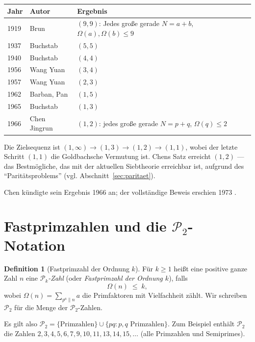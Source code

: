 \documentclass[12pt,a4paper]{amsart}
\theoremstyle{definition}
\newtheorem{definition}[theorem]{Definition}
\newcommand{\Ptwo}{\mathcal{P}_2}
\newcommand{\OOmega}{\Omega}
\begin{document}
\begin{center}
\begin{tabular}{@{}lll@{}}
\toprule
Jahr & Autor & Ergebnis \\ \midrule
1919 & Brun        & $(9,9)$: Jedes große gerade $N = a + b$, $\OOmega(a),\OOmega(b) \leq 9$ \\
1937 & Buchstab    & $(5,5)$ \\
1940 & Buchstab    & $(4,4)$ \\
1956 & Wang Yuan   & $(3,4)$ \\
1957 & Wang Yuan   & $(2,3)$ \\
1962 & Barban, Pan & $(1,5)$ \\
1965 & Buchstab    & $(1,3)$ \\
1966 & Chen Jingrun & $(1,2)$: jedes große gerade $N = p + q$, $\OOmega(q) \leq 2$ \\
\bottomrule
\end{tabular}
\end{center}

Die Zielsequenz ist $(1,\infty) \to (1,3) \to (1,2) \to (1,1)$, wobei
der letzte Schritt $(1,1)$ die Goldbachsche Vermutung ist.  Chens Satz
erreicht $(1,2)$ --- das Bestmögliche, das mit der aktuellen Siebtheorie
erreichbar ist, aufgrund des ``Paritätsproblems'' (vgl. Abschnitt~\ref{sec:paritaet}).

Chen kündigte sein Ergebnis 1966 an; der vollständige Beweis erschien 1973
\cite{Chen1973}.

\section{Fastprimzahlen und die $\Ptwo$-Notation}

\begin{definition}[Fastprimzahl der Ordnung $k$]
  Für $k \geq 1$ heißt eine positive ganze Zahl $n$ eine
  \emph{$\mathcal{P}_k$-Zahl} (oder \emph{Fastprimzahl der Ordnung $k$}), falls
  \[
    \OOmega(n) \;\leq\; k,
  \]
  wobei $\OOmega(n) = \sum_{p^a \| n} a$ die Primfaktoren mit Vielfachheit
  zählt.  Wir schreiben $\Ptwo$ für die Menge der $\mathcal{P}_2$-Zahlen.
\end{definition}

Es gilt also $\Ptwo = \{\text{Primzahlen}\} \cup \{pq : p, q \text{ Primzahlen}\}$.
Zum Beispiel enthält $\Ptwo$ die Zahlen $2, 3, 4, 5, 6, 7, 9, 10, 11, 13,
14, 15, \ldots$ (alle Primzahlen und Semiprimes).
\end{document}
